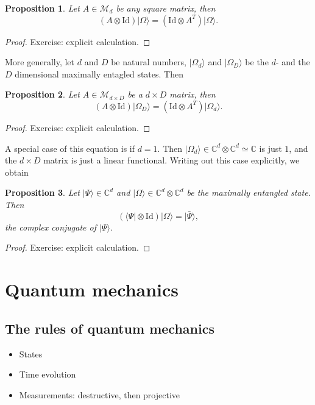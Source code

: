 \documentclass{article}
\newtheorem{proposition}{Proposition}
\theoremstyle{definition}
\newcommand{\id}{\mathrm{Id}}
\newcommand{\ket}[1]{\vert #1 \rangle}
\newcommand{\bra}[1]{\langle #1 \vert}
\begin{document}
\begin{proposition}\label{prop:max_ent_pull_through}
  Let $A\in\mathcal{M}_d$ be any square matrix, then 
  \begin{equation*}
     (A \otimes \id) \ket{\Omega} = (\id\otimes A^T) \ket{\Omega}.
  \end{equation*}
\end{proposition}
\begin{proof}
   Exercise: explicit calculation.
\end{proof}
More generally, let $d$ and $D$ be natural numbers, $\ket{\Omega_d}$ and $\ket{\Omega_D}$ be the $d$- and the $D$ dimensional maximally entagled states. Then
\begin{proposition}
  Let $A\in\mathcal{M}_{d\times D}$ be a $d\times D$ matrix, then 
  \begin{equation*}
    (A \otimes \id) \ket{\Omega_D} = (\id\otimes A^T) \ket{\Omega_d}.
  \end{equation*}
\end{proposition}
\begin{proof}
  Exercise: explicit calculation.
\end{proof}
A special case of this equation is if $d=1$. Then $\ket{\Omega_d} \in \mathbb{C}^d\otimes \mathbb{C}^d \simeq \mathbb{C}$ is just $1$, and the $d\times D$ matrix is just a linear functional. Writing out this case explicitly, we obtain 
\begin{proposition}\label{prop:max_ent_pull_through_lin_fcn}
  Let $\ket{\Psi}\in\mathbb{C}^{d}$ and $\ket{\Omega}\in \mathbb{C}^d \otimes \mathbb{C}^d$ be the maximally entangled state. Then 
  \begin{equation*}
    (\bra{\Psi} \otimes \id) \ket{\Omega} = \ket{\bar{\Psi}},
  \end{equation*}
  the complex conjugate of $\ket{\Psi}$.
\end{proposition}
\begin{proof}
  Exercise: explicit calculation.
\end{proof}


\section{Quantum mechanics}

\subsection{The rules of quantum mechanics}
 \begin{itemize}
   \item States
   \item Time evolution
   \item Measurements: destructive, then projective
 \end{itemize}
 
\end{document}
